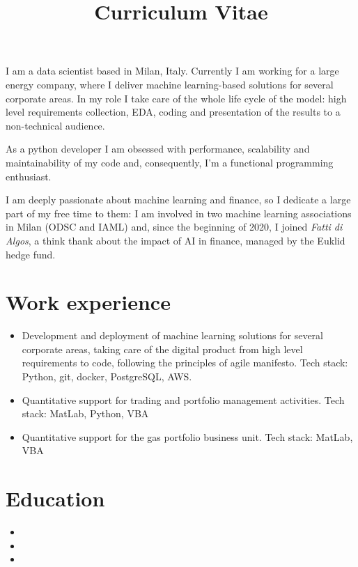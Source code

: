 \documentclass[11pt,a4paper,sans]{moderncv}        %
\title{Curriculum Vitae}                               %
\begin{document}
\makecvtitle
\small{I am a data scientist based in Milan, Italy. Currently I am working for a large energy company, where I deliver machine learning-based solutions for several corporate areas.
In my role I take care of the whole life cycle of the model: high level requirements collection, EDA, coding and presentation of the results to a non-technical audience. 

As a python developer I am obsessed with performance, scalability and maintainability of my code and, consequently, I'm a functional programming enthusiast. 

I am deeply passionate about machine learning and finance, so I dedicate a large part of my free time to them: I am involved in two machine learning associations in Milan (ODSC and IAML) and, since the beginning of 2020, I joined \emph{Fatti di Algos}, a think thank about the impact of AI in finance, managed by the Euklid hedge fund.}

\section{Work experience}

\begin{itemize}
\item{
Development and deployment of machine learning solutions for several corporate areas, taking care of the digital product from high level requirements to code, following the principles of agile manifesto. Tech stack: Python, git, docker, PostgreSQL, AWS.
}
\item{
Quantitative support for trading and portfolio management activities. Tech stack: MatLab, Python, VBA
}
\item{
Quantitative support for the gas portfolio business unit. Tech stack: MatLab, VBA}
\end{itemize}

\section{Education}
\begin{itemize}
\item{}
\item{}
\item{}
\end{itemize}
\end{document}
